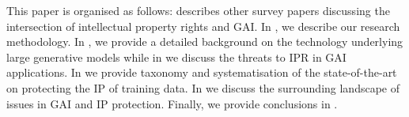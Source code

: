 \documentclass[conference]{IEEEtran}
\begin{document}
This paper is organised as follows:  describes other survey papers discussing the intersection of intellectual property rights and GAI. In , we describe our research methodology. In , we provide a detailed background on the technology underlying large generative models while in  we discuss the threats to IPR in GAI applications. In  we provide taxonomy and systematisation of the state-of-the-art on protecting the IP of training data. 
In  we discuss the surrounding landscape of issues in GAI and IP protection. Finally, we provide conclusions in .
\end{document}
